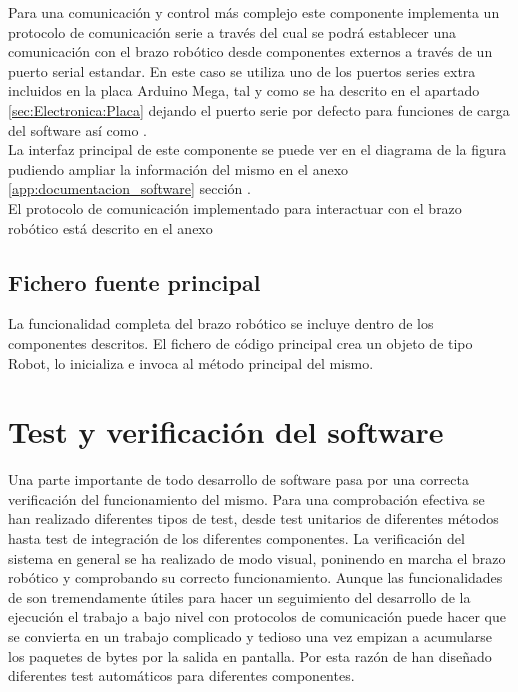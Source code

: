         Para una comunicación y control más complejo este componente implementa un protocolo de comunicación serie a través del cual se podrá establecer una comunicación con el brazo robótico desde componentes externos a través de un puerto serial estandar. En este caso se utiliza uno de los puertos series extra incluidos en la placa Arduino Mega, tal y como se ha descrito en el apartado \ref{sec:Electronica:Placa} dejando el puerto serie por defecto para funciones de carga del software así como .
        \\
        
        La interfaz principal de este componente se puede ver en el diagrama de la figura \completar pudiendo ampliar la información del mismo en el anexo \ref{app:documentacion_software} sección \completar.
        \\
        
        El protocolo de comunicación implementado para interactuar con el brazo robótico está descrito en el anexo \completar

    \subsection{Fichero fuente principal} \label{subsec:SW:maincpp}
        La funcionalidad completa del brazo robótico se incluye dentro de los componentes descritos. El fichero de código principal crea un objeto de tipo Robot, lo inicializa e invoca al método principal del mismo.

\section{Test y verificación del software} \label{sec:SW:test}

    Una parte importante de todo desarrollo de software pasa por una correcta verificación del funcionamiento del mismo. Para una comprobación efectiva se han realizado diferentes tipos de test, desde test unitarios de diferentes métodos hasta test de integración de los diferentes componentes. La verificación del sistema en general se ha realizado de modo visual, poninendo en marcha el brazo robótico y comprobando su correcto funcionamiento. Aunque las funcionalidades de  son tremendamente útiles para hacer un seguimiento del desarrollo de la ejecución el trabajo a bajo nivel con protocolos de comunicación puede hacer que se convierta en un trabajo complicado y tedioso una vez empizan a acumularse los paquetes de bytes por la salida en pantalla. Por esta razón de han diseñado diferentes test automáticos para diferentes componentes.
    \\
    
